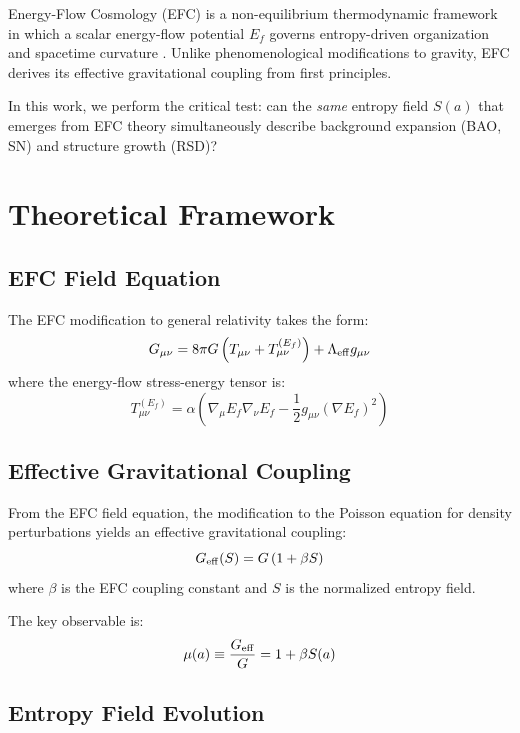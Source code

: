 \documentclass[12pt,a4paper]{article}
\begin{document}
Energy-Flow Cosmology (EFC) is a non-equilibrium thermodynamic framework in which a scalar 
energy-flow potential $E_f$ governs entropy-driven organization and spacetime curvature 
\citep{Magnusson2025a}. Unlike phenomenological modifications to gravity, EFC derives 
its effective gravitational coupling from first principles.

In this work, we perform the critical test: can the \emph{same} entropy field $S(a)$ 
that emerges from EFC theory simultaneously describe background expansion (BAO, SN) 
and structure growth (RSD)?

\section{Theoretical Framework}

\subsection{EFC Field Equation}

The EFC modification to general relativity takes the form:
\begin{equation}
G_{\mu\nu} = 8\pi G \left( T_{\mu\nu} + T^{(E_f)}_{\mu\nu} \right) + \Lambda_{\rm eff} g_{\mu\nu}
\end{equation}
where the energy-flow stress-energy tensor is:
\begin{equation}
T^{(E_f)}_{\mu\nu} = \alpha \left( \nabla_\mu E_f \nabla_\nu E_f - \frac{1}{2} g_{\mu\nu} (\nabla E_f)^2 \right)
\end{equation}

\subsection{Effective Gravitational Coupling}

From the EFC field equation, the modification to the Poisson equation for density 
perturbations yields an effective gravitational coupling:
\begin{equation}
G_{\rm eff}(S) = G \left( 1 + \beta S \right)
\end{equation}
where $\beta$ is the EFC coupling constant and $S$ is the normalized entropy field.

The key observable is:
\begin{equation}
\mu(a) \equiv \frac{G_{\rm eff}}{G} = 1 + \beta S(a)
\label{eq:mu}
\end{equation}

\subsection{Entropy Field Evolution}
\end{document}
